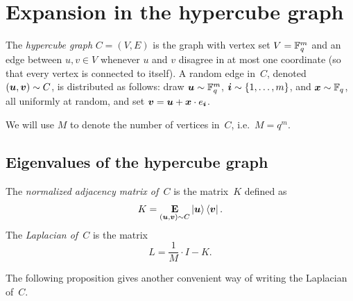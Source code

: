 
\section{Expansion in the hypercube graph}
\label{sec:expansion}

\begin{definition}
The \emph{hypercube graph} $C = (V,E)$ is the graph with vertex set $V = \mathbb F_q^m$ and an edge between $u, v \in V$ whenever $u$ and $v$ disagree in at most one coordinate (so that every vertex is connected to itself).
A random edge in~$C$, denoted $(\boldsymbol{u}, \boldsymbol{v}) \sim C$,
is distributed as follows:
draw $\boldsymbol{u} \sim \mathbb F_q^m$, $\boldsymbol{i} \sim \{1, \ldots, m\}$,  and ${\boldsymbol{x}} \sim \mathbb F_q$, all uniformly at random, and set $\boldsymbol{v} = \boldsymbol{u} + {\boldsymbol{x}} \cdot e_{\boldsymbol{i}}$.
\end{definition}

We will use $M$ to denote the number of vertices in~$C$, i.e.\ $M = q^m$.

\subsection{Eigenvalues of the hypercube graph}

\begin{definition}
The \emph{normalized adjacency matrix of~$C$} is the matrix~$K$ defined as
\begin{equation*}
K =  \mathop{\bf E\/}_{(\boldsymbol{u}, \boldsymbol{v}) \sim C} \ket{\boldsymbol{u}}\bra{\boldsymbol{v}}.
\end{equation*}
The \emph{Laplacian of~$C$} is the matrix
\begin{equation*}
L = \frac{1}{M} \cdot I - K.
\end{equation*}
\end{definition}

The following proposition gives another convenient way of writing the Laplacian of~$C$.

